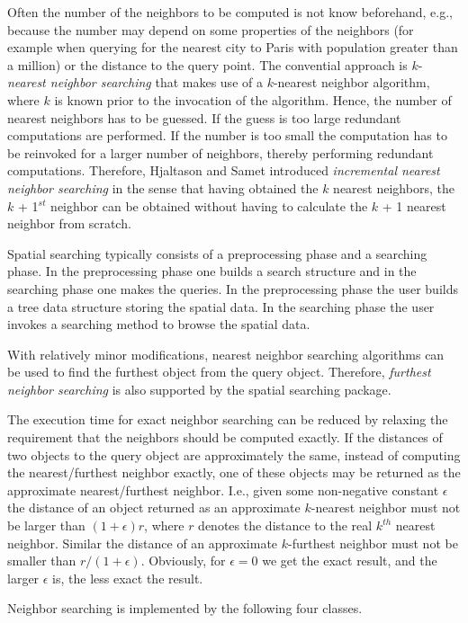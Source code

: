Often the number of the neighbors to be computed is not know
beforehand, e.g., because the number may depend on some properties of
the neighbors (for example when querying for the nearest city to Paris with
population greater than a million) or the distance to the query point.
The convential approach is $k$-{\em nearest neighbor searching} that
makes use of a $k$-nearest neighbor algorithm, where $k$ is known
prior to the invocation of the algorithm.  Hence, the number of
nearest neighbors has to be guessed. If the guess is too large
redundant computations are performed.  If the number is too small the
computation has to be reinvoked for a larger number of neighbors,
thereby performing redundant computations.  Therefore, Hjaltason and
Samet \cite{hs-rsd-95} introduced {\em incremental nearest neighbor
searching} in the sense that having obtained the $k$ nearest
neighbors, the $k$ + 1$^{st}$ neighbor can be obtained without having
to calculate the $k$ + 1 nearest neighbor from scratch.
 

Spatial searching typically consists of a preprocessing phase and a
searching phase.  In the preprocessing phase one builds a search
structure and in the searching phase one makes the queries.  In the
preprocessing phase the user builds a tree data structure
storing the spatial data.  In the searching phase the user invokes a
searching method to browse the spatial data.

With relatively minor modifications, nearest neighbor searching
algorithms can be used to find the furthest object from the query
object.  Therefore, {\em furthest neighbor searching} is also
supported by the spatial searching package.

The execution time for exact neighbor searching can be reduced by
relaxing the requirement that the neighbors should be computed
exactly.  If the distances of two objects to the query object are
approximately the same, instead of computing the nearest/furthest
neighbor exactly, one of these objects may be returned as the
approximate nearest/furthest neighbor. I.e., given some non-negative
constant $\epsilon$ the distance of an object returned as an
approximate $k$-nearest neighbor must not be larger than
$(1+\epsilon)r$, where $r$ denotes the distance to the real $k^{th}$
nearest neighbor.  Similar the distance of an approximate $k$-furthest
neighbor must not be smaller than $r/(1+\epsilon)$.  Obviously, for
$\epsilon=0$ we get the exact result, and the larger $\epsilon$ is,
the less exact the result.

Neighbor searching is implemented by the following four classes.


